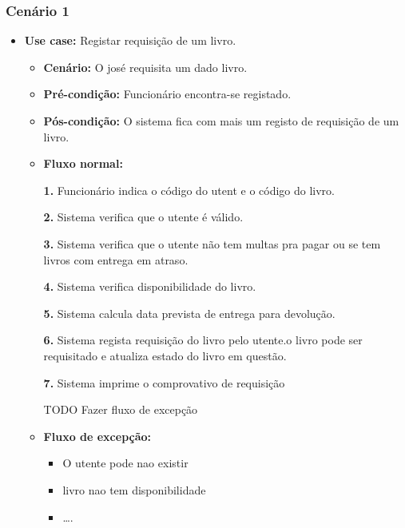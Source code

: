 \documentclass[11pt]{article}
\begin{document}
\subsubsection{Cenário 1}
\label{sec:org1db0939}
\begin{itemize}
\item \textbf{Use case:} Registar requisição de um livro.
\begin{itemize}
\item \textbf{Cenário:}
O josé requisita um dado livro.

\item \textbf{Pré-condição:}
Funcionário encontra-se registado.

\item \textbf{Pós-condição:}
O sistema fica com mais um registo de requisição de um livro.

\item \textbf{Fluxo normal:}

\textbf{1.} Funcionário indica o código do utent e o código do livro.

\textbf{2.} Sistema verifica que o utente é válido.

\textbf{3.} Sistema verifica que o utente não tem multas pra pagar ou se tem livros com entrega em atraso.

\textbf{4.} Sistema verifica disponibilidade do livro.

\textbf{5.} Sistema calcula data prevista de entrega para devolução.

\textbf{6.} Sistema regista requisição do livro pelo utente.o livro pode ser requisitado e atualiza estado do livro em questão.

\textbf{7.} Sistema imprime o comprovativo de requisição

TODO Fazer fluxo de excepção
\item \textbf{Fluxo de excepção:}
\begin{itemize}
\item O utente pode nao existir
\item livro nao tem disponibilidade
\item \ldots{}.
\end{itemize}
\end{itemize}
\end{itemize}
\end{document}
